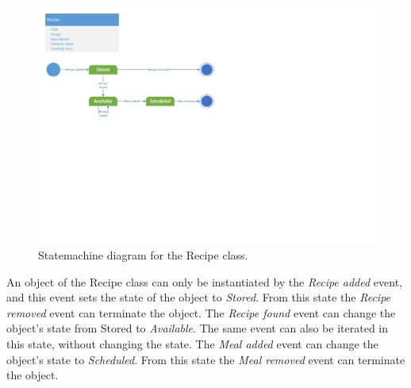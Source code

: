 \begin{figure}[H]
	\centering
	\includegraphics[clip=true, trim=0.5cm 11cm 14cm 0.5cm]{Grafik/FoodPlanner/Recipe.pdf}
	\caption{Statemachine diagram for the Recipe class.} \label{RecipeClass}
\end{figure}

An object of the Recipe class can only be instantiated by the \textit{Recipe added} event, and this event sets the state of the object to \textit{Stored}. From this state the \textit{Recipe removed} event can terminate the object. The \textit{Recipe found} event can change the object's state from Stored to \textit{Available}. The same event can also be iterated in this state, without changing the state. The \textit{Meal added} event can change the object's state to \textit{Scheduled}. From this state the \textit{Meal removed} event can terminate the object.
